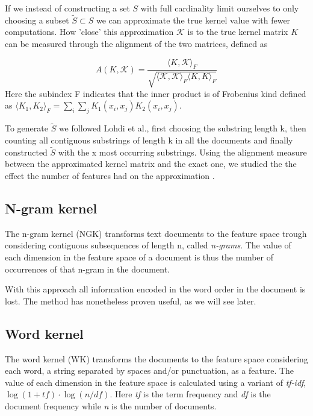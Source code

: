 If we instead of constructing a set $ S $ with full cardinality limit ourselves to only choosing a subset $ \tilde{S} \subset S $ we can approximate the true kernel value with fewer computations. How 'close' this approximation $ \mathcal{K} $ is to the true kernel matrix $ K $ can be measured through the alignment of the two matrices, defined as

\begin{equation}\label{key}
A(K,\mathcal{K}) = \dfrac{\langle K, \mathcal{K}\rangle_{F}}{\sqrt{\langle \mathcal{K}, \mathcal{K}\rangle_{F} \langle K, K\rangle_{F} }}
\end{equation}
Here the subindex F indicates that the inner product is of Frobenius kind defined as $ \langle K_1,K_2 \rangle_{F} = \sum_{i}\sum_{j}K_1(x_i,x_j)K_2(x_i,x_j) $.

To generate $ \tilde{S} $ we followed Lohdi et al., first choosing the substring length k, then counting all contiguous substrings of length k in all the documents and finally constructed $ \tilde{S} $ with the x most occurring substrings. Using the alignment measure between the approximated kernel matrix and the exact one, we studied the the effect the number of features had on the approximation
. 
\subsection{N-gram kernel}
The n-gram kernel (NGK) transforms text documents to the feature space trough  considering contiguous subsequences of length n, called \textit{n-grams}. The value of each dimension in the feature space of a document is thus the number of occurrences of that n-gram in the document. 

With this approach all information encoded in the word order in the document is lost. The method has nonetheless proven useful, as we will see later.

\subsection{Word kernel}
The word kernel (WK) transforms the documents to the feature space considering each word, a string separated by spaces and/or punctuation, as a feature. The value of each dimension in the feature space is calculated using a variant of \textit{tf-idf}, $ \log(1+tf) \cdot \log(n/df) $. Here \textit{tf} is the term frequency and \textit{df} is the document frequency while \textit{n} is the number of documents. 


